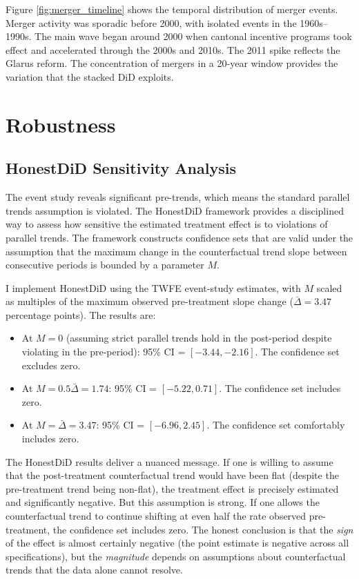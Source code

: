 \documentclass[12pt]{article}
\begin{document}
Figure \ref{fig:merger_timeline} shows the temporal distribution of merger events. Merger activity was sporadic before 2000, with isolated events in the 1960s--1990s. The main wave began around 2000 when cantonal incentive programs took effect and accelerated through the 2000s and 2010s. The 2011 spike reflects the Glarus reform. The concentration of mergers in a 20-year window provides the variation that the stacked DiD exploits.


\section{Robustness}

\subsection{HonestDiD Sensitivity Analysis}

The event study reveals significant pre-trends, which means the standard parallel trends assumption is violated. The \citet{rambachan2023more} HonestDiD framework provides a disciplined way to assess how sensitive the estimated treatment effect is to violations of parallel trends. The framework constructs confidence sets that are valid under the assumption that the maximum change in the counterfactual trend slope between consecutive periods is bounded by a parameter $M$.

I implement HonestDiD using the TWFE event-study estimates, with $M$ scaled as multiples of the maximum observed pre-treatment slope change ($\bar{\Delta} = 3.47$ percentage points). The results are:

\begin{itemize}
    \item At $M = 0$ (assuming strict parallel trends hold in the post-period despite violating in the pre-period): 95\% CI = $[-3.44, -2.16]$. The confidence set excludes zero.
    \item At $M = 0.5\bar{\Delta} = 1.74$: 95\% CI = $[-5.22, 0.71]$. The confidence set includes zero.
    \item At $M = \bar{\Delta} = 3.47$: 95\% CI = $[-6.96, 2.45]$. The confidence set comfortably includes zero.
\end{itemize}

The HonestDiD results deliver a nuanced message. If one is willing to assume that the post-treatment counterfactual trend would have been flat (despite the pre-treatment trend being non-flat), the treatment effect is precisely estimated and significantly negative. But this assumption is strong. If one allows the counterfactual trend to continue shifting at even half the rate observed pre-treatment, the confidence set includes zero. The honest conclusion is that the \textit{sign} of the effect is almost certainly negative (the point estimate is negative across all specifications), but the \textit{magnitude} depends on assumptions about counterfactual trends that the data alone cannot resolve.
\end{document}
